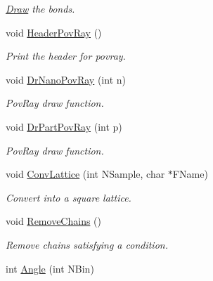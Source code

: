 \begin{DoxyCompactItemize}
\begin{DoxyCompactList}\small\item\em \hyperlink{classDraw}{Draw} the bonds. \end{DoxyCompactList}\item 
void \hyperlink{classElPoly_a79715be09324f2b58cc98385a5f62e7b}{Header\+Pov\+Ray} ()\hypertarget{classElPoly_a79715be09324f2b58cc98385a5f62e7b}{}\label{classElPoly_a79715be09324f2b58cc98385a5f62e7b}

\begin{DoxyCompactList}\small\item\em Print the header for povray. \end{DoxyCompactList}\item 
void \hyperlink{classElPoly_a760f4fa1edbecc53d532140617dbf8ab}{Dr\+Nano\+Pov\+Ray} (int n)\hypertarget{classElPoly_a760f4fa1edbecc53d532140617dbf8ab}{}\label{classElPoly_a760f4fa1edbecc53d532140617dbf8ab}

\begin{DoxyCompactList}\small\item\em Pov\+Ray draw function. \end{DoxyCompactList}\item 
void \hyperlink{classElPoly_aedbaa04884ac62d32f3cce78fdfd92b8}{Dr\+Part\+Pov\+Ray} (int p)\hypertarget{classElPoly_aedbaa04884ac62d32f3cce78fdfd92b8}{}\label{classElPoly_aedbaa04884ac62d32f3cce78fdfd92b8}

\begin{DoxyCompactList}\small\item\em Pov\+Ray draw function. \end{DoxyCompactList}\item 
void \hyperlink{classElPoly_a3e03070150b93328661ff2c857eebbf4}{Conv\+Lattice} (int N\+Sample, char $\ast$F\+Name)\hypertarget{classElPoly_a3e03070150b93328661ff2c857eebbf4}{}\label{classElPoly_a3e03070150b93328661ff2c857eebbf4}

\begin{DoxyCompactList}\small\item\em Convert into a square lattice. \end{DoxyCompactList}\item 
void \hyperlink{classElPoly_abfd537703af91a0dceb86c6bba5bd213}{Remove\+Chains} ()\hypertarget{classElPoly_abfd537703af91a0dceb86c6bba5bd213}{}\label{classElPoly_abfd537703af91a0dceb86c6bba5bd213}

\begin{DoxyCompactList}\small\item\em Remove chains satisfying a condition. \end{DoxyCompactList}\item 
int \hyperlink{classElPoly_ae3aab8086f988eecdd12b8f29f45a56a}{Angle} (int N\+Bin)\hypertarget{classElPoly_ae3aab8086f988eecdd12b8f29f45a56a}{}\label{classElPoly_ae3aab8086f988eecdd12b8f29f45a56a}


\end{DoxyCompactItemize}
